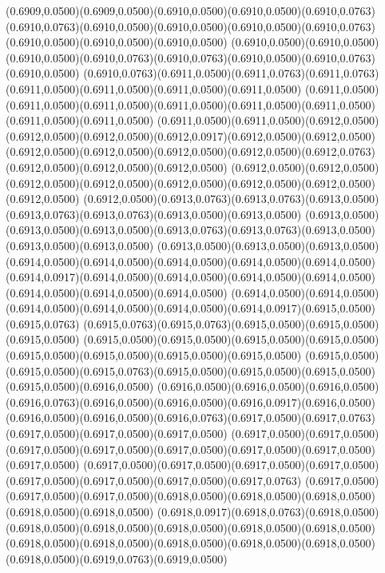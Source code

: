 (0.6909,0.0500)(0.6909,0.0500)(0.6910,0.0500)(0.6910,0.0500)(0.6910,0.0763)
\PST@Solid(0.6910,0.0763)(0.6910,0.0500)(0.6910,0.0500)(0.6910,0.0500)(0.6910,0.0763)(0.6910,0.0500)(0.6910,0.0500)(0.6910,0.0500)
(0.6910,0.0500)(0.6910,0.0500)(0.6910,0.0500)(0.6910,0.0763)(0.6910,0.0763)(0.6910,0.0500)(0.6910,0.0763)(0.6910,0.0500)
(0.6910,0.0763)(0.6911,0.0500)(0.6911,0.0763)(0.6911,0.0763)(0.6911,0.0500)(0.6911,0.0500)(0.6911,0.0500)(0.6911,0.0500)
(0.6911,0.0500)(0.6911,0.0500)(0.6911,0.0500)(0.6911,0.0500)(0.6911,0.0500)(0.6911,0.0500)(0.6911,0.0500)(0.6911,0.0500)
(0.6911,0.0500)(0.6911,0.0500)(0.6912,0.0500)(0.6912,0.0500)(0.6912,0.0500)(0.6912,0.0917)(0.6912,0.0500)(0.6912,0.0500)
(0.6912,0.0500)(0.6912,0.0500)(0.6912,0.0500)(0.6912,0.0500)(0.6912,0.0763)(0.6912,0.0500)(0.6912,0.0500)(0.6912,0.0500)
(0.6912,0.0500)(0.6912,0.0500)(0.6912,0.0500)(0.6912,0.0500)(0.6912,0.0500)(0.6912,0.0500)(0.6912,0.0500)(0.6912,0.0500)
(0.6912,0.0500)(0.6913,0.0763)(0.6913,0.0763)(0.6913,0.0500)(0.6913,0.0763)(0.6913,0.0763)(0.6913,0.0500)(0.6913,0.0500)
(0.6913,0.0500)(0.6913,0.0500)(0.6913,0.0500)(0.6913,0.0763)(0.6913,0.0763)(0.6913,0.0500)(0.6913,0.0500)(0.6913,0.0500)
(0.6913,0.0500)(0.6913,0.0500)(0.6913,0.0500)(0.6914,0.0500)(0.6914,0.0500)(0.6914,0.0500)(0.6914,0.0500)(0.6914,0.0500)
(0.6914,0.0917)(0.6914,0.0500)(0.6914,0.0500)(0.6914,0.0500)(0.6914,0.0500)(0.6914,0.0500)(0.6914,0.0500)(0.6914,0.0500)
(0.6914,0.0500)(0.6914,0.0500)(0.6914,0.0500)(0.6914,0.0500)(0.6914,0.0500)(0.6914,0.0917)(0.6915,0.0500)(0.6915,0.0763)
(0.6915,0.0763)(0.6915,0.0763)(0.6915,0.0500)(0.6915,0.0500)(0.6915,0.0500)
\PST@Solid(0.6915,0.0500)(0.6915,0.0500)(0.6915,0.0500)(0.6915,0.0500)(0.6915,0.0500)(0.6915,0.0500)(0.6915,0.0500)(0.6915,0.0500)
(0.6915,0.0500)(0.6915,0.0500)(0.6915,0.0763)(0.6915,0.0500)(0.6915,0.0500)(0.6915,0.0500)(0.6915,0.0500)(0.6916,0.0500)
(0.6916,0.0500)(0.6916,0.0500)(0.6916,0.0500)(0.6916,0.0763)(0.6916,0.0500)(0.6916,0.0500)(0.6916,0.0917)(0.6916,0.0500)
(0.6916,0.0500)(0.6916,0.0500)(0.6916,0.0763)(0.6917,0.0500)(0.6917,0.0763)(0.6917,0.0500)(0.6917,0.0500)(0.6917,0.0500)
(0.6917,0.0500)(0.6917,0.0500)(0.6917,0.0500)(0.6917,0.0500)(0.6917,0.0500)(0.6917,0.0500)(0.6917,0.0500)(0.6917,0.0500)
(0.6917,0.0500)(0.6917,0.0500)(0.6917,0.0500)(0.6917,0.0500)(0.6917,0.0500)(0.6917,0.0500)(0.6917,0.0500)(0.6917,0.0763)
(0.6917,0.0500)(0.6917,0.0500)(0.6917,0.0500)(0.6918,0.0500)(0.6918,0.0500)(0.6918,0.0500)(0.6918,0.0500)(0.6918,0.0500)
(0.6918,0.0917)(0.6918,0.0763)(0.6918,0.0500)(0.6918,0.0500)(0.6918,0.0500)(0.6918,0.0500)(0.6918,0.0500)(0.6918,0.0500)
(0.6918,0.0500)(0.6918,0.0500)(0.6918,0.0500)(0.6918,0.0500)(0.6918,0.0500)(0.6918,0.0500)(0.6919,0.0763)(0.6919,0.0500)
